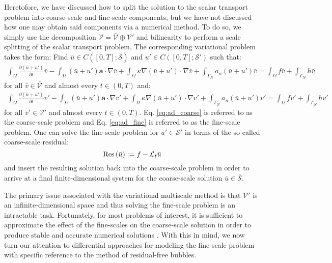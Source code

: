 \documentclass[11pt]{article}
\begin{document}
Heretofore, we have discussed how to split the solution to the scalar transport problem into coarse-scale and fine-scale components, but we have not discussed how one may obtain said components via a numerical method.  To do so, we simply use the decomposition $\mathcal{V} = \bar{\mathcal{V}} \oplus \mathcal{V}'$ and bilinearity to perform a scale splitting of the scalar transport problem.  The corresponding variational problem takes the form: Find $\bar{u} \in C\left([0,T];\bar{\mathcal{S}}\right)$ and $u' \in C\left([0,T];\mathcal{S}'\right)$ such that:
\begin{equation}\label{eq:ad_coarse}
\begin{aligned}
\int_\Omega \frac{\partial \left(\bar{u} + u'\right)}{\partial t} \bar{v} -  \int_\Omega \left(\bar{u} + u'\right) \bm{a} \cdot \nabla \bar{v} +  \int_\Omega \kappa \nabla \left(\bar{u} + u'\right) \cdot \nabla \bar{v} + \int_{\Gamma_N} a_n \left(\bar{u} + u'\right) \bar{v} = \int_\Omega f \bar{v} + \int_{\Gamma_N} h \bar{v}
\end{aligned}
\end{equation}
for all $\bar{v} \in \bar{\mathcal{V}}$ and almost every $t \in (0,T)$ and:
\begin{equation}\label{eq:ad_fine}
\begin{aligned}
\int_\Omega \frac{\partial \left(\bar{u} + u'\right)}{\partial t} v' -  \int_\Omega \left(\bar{u} + u'\right) \bm{a} \cdot \nabla v' +  \int_\Omega \kappa \nabla \left(\bar{u} + u'\right) \cdot \nabla v' + \int_{\Gamma_N} a_n \left(\bar{u} + u'\right) v' = \int_\Omega f v' + \int_{\Gamma_N} h v'
\end{aligned}
\end{equation}
for all $v' \in \mathcal{V}'$ and almost every $t \in (0,T)$.  Eq. \eqref{eq:ad_coarse} is referred to as the coarse-scale problem and Eq. \eqref{eq:ad_fine} is referred to as the fine-scale problem.  One can solve the fine-scale problem for $u' \in \mathcal{S}'$ in terms of the so-called coarse-scale residual:
\begin{equation}
\textup{Res}\left(\bar{u}\right) := f - \mathcal{L}_t \bar{u}
\end{equation}
and insert the resulting solution back into the coarse-scale problem in order to arrive at a final finite-dimensional system for the coarse-scale solution $\bar{u} \in \bar{\mathcal{S}}$.

The primary issue associated with the variational multiscale method is that $\mathcal{V}'$ is an infinite-dimensional space and thus solving the fine-scale problem is an intractable task.  Fortunately, for most problems of interest, it is sufficient to approximate the effect of the fine-scales on the coarse-scale solution in order to produce stable and accurate numerical solutions \cite{Cottrell07}.  With this in mind, we now turn our attention to differential approaches for modeling the fine-scale problem with specific reference to the method of residual-free bubbles.
\end{document}

